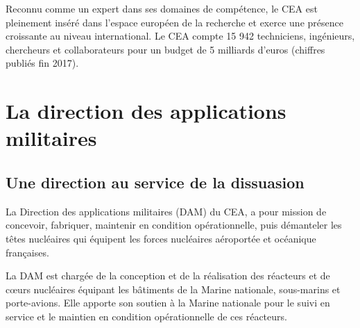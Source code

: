 \documentclass[12pt,a4paper,twoside]{article}
\begin{document}
    Reconnu comme un expert dans ses domaines de compétence, le CEA est pleinement inséré dans l'espace européen de
    la recherche et exerce une présence croissante au niveau international. Le CEA compte 15 942 techniciens,
    ingénieurs, chercheurs et collaborateurs pour un budget de 5 milliards d'euros (chiffres publiés fin 2017).

    \begin{figure}[b]
        \centering
    \end{figure}

    \newpage

    \section*{La direction des applications militaires}

    \subsection*{Une direction au service de la dissuasion}
    La Direction des applications militaires (DAM) du CEA, a pour mission
    de concevoir, fabriquer, maintenir en condition opérationnelle, puis démanteler
    les têtes nucléaires qui équipent les forces nucléaires aéroportée et océanique
    françaises.

    La DAM est chargée de la conception et de la réalisation des réacteurs et de
    c\oe urs nucléaires équipant les bâtiments de la Marine nationale, sous-marins
    et porte-avions. Elle apporte son soutien à la Marine nationale pour le suivi en
    service et le maintien en condition opérationnelle de ces réacteurs.
\end{document}
